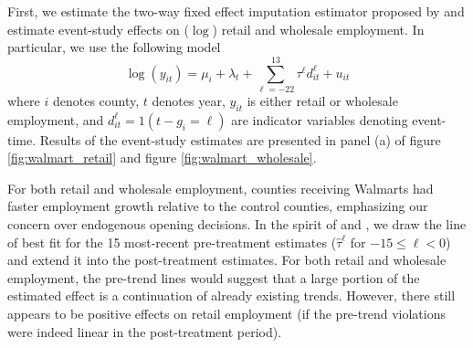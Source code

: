 \documentclass[12pt]{article}
\begin{document}
First, we estimate the two-way fixed effect imputation estimator proposed by \citet{Borusyak_Jaravel_Spiess_2021} and estimate event-study effects on ($\log$) retail and wholesale employment. In particular, we use the following model
\begin{equation}\label{eq:Walmart_twfe}
  \log(y_{it}) = \mu_i + \lambda_t + \sum_{\ell=-22}^{13} \tau^\ell d_{it}^\ell + u_{it}
\end{equation}
where $i$ denotes county, $t$ denotes year, $y_{it}$ is either retail or wholesale employment, and $d_{it}^\ell = 1(t - g_i = \ell)$ are indicator variables denoting event-time. Results of the event-study estimates are presented in panel (a) of figure \ref{fig:walmart_retail} and figure \ref{fig:walmart_wholesale}.

For both retail and wholesale employment, counties receiving Walmarts had faster employment growth relative to the control counties, emphasizing our concern over endogenous opening decisions. In the spirit of \citet{Freyaldenhoven_Hansen_Perez_Shapiro_2022} and \citet{rambachan2023more}, we draw the line of best fit for the 15 most-recent pre-treatment estimates ($\hat{\tau}^\ell$ for $-15 \leq \ell < 0$) and extend it into the post-treatment estimates. For both retail and wholesale employment, the pre-trend lines would suggest that a large portion of the estimated effect is a continuation of already existing trends. However, there still appears to be positive effects on retail employment (if the pre-trend violations were indeed linear in the post-treatment period). 
\end{document}
